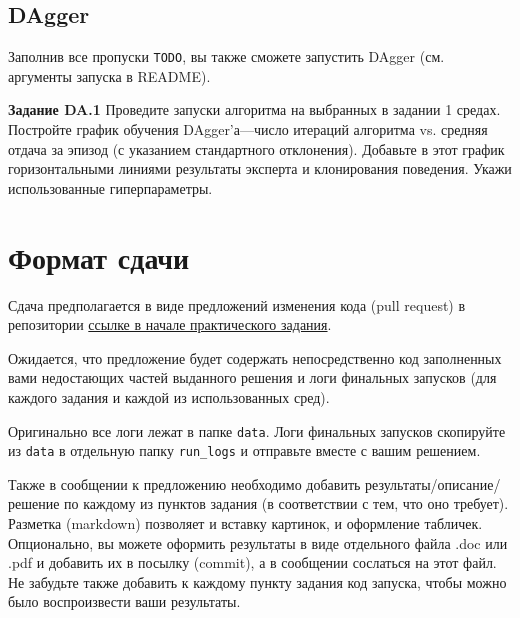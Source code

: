 \documentclass[12pt, oneside]{article}
\begin{document}
\subsection{DAgger}

Заполнив все пропуски \verb|TODO|, вы также сможете запустить DAgger (см. аргументы запуска в README).

\textbf{Задание DA.1} Проведите запуски алгоритма на выбранных в задании 1 средах. Постройте график обучения DAgger'а---число итераций алгоритма vs. средняя отдача за эпизод (с указанием стандартного отклонения). Добавьте в этот график горизонтальными линиями результаты эксперта и клонирования поведения. Укажи использованные гиперпараметры.

\section{Формат сдачи}

Сдача предполагается в виде предложений изменения кода (pull request) в репозитории \href{https://github.com/pkuderov/mipt-rl-hw-2022}{ссылке в начале практического задания}.

Ожидается, что предложение будет содержать непосредственно код заполненных вами недостающих частей выданного решения и логи финальных запусков (для каждого задания и каждой из использованных сред). 

Оригинально все логи лежат в папке \verb|data|. Логи финальных запусков скопируйте из \verb|data| в отдельную папку \verb|run_logs| и отправьте вместе с вашим решением.

Также в сообщении к предложению необходимо добавить результаты/описание/решение по каждому из пунктов задания (в соответствии с тем, что оно требует). Разметка (markdown) позволяет и вставку картинок, и оформление табличек. Опционально, вы можете оформить результаты в виде отдельного файла .doc или .pdf и добавить их в посылку (commit), а в сообщении сослаться на этот файл. Не забудьте также добавить к каждому пункту задания код запуска, чтобы можно было воспроизвести ваши результаты.
\end{document}
